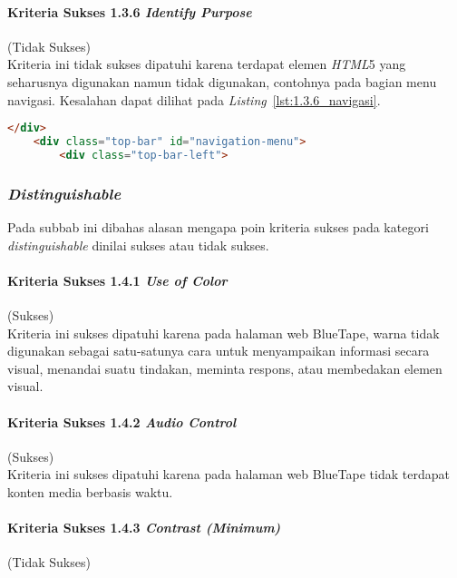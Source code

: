 \paragraph{Kriteria Sukses 1.3.6 \textit{Identify Purpose}}
\label{par:kepatuhan_bluetape_kriteria_sukses_1.3.6}
(Tidak Sukses)\\

Kriteria ini tidak sukses dipatuhi karena terdapat elemen \textit{HTML}5 yang seharusnya digunakan namun tidak digunakan, contohnya pada bagian menu navigasi. Kesalahan dapat dilihat pada \mbox{\textit{Listing} \ref{lst:1.3.6_navigasi}}.

\begin{lstlisting}[frame=single, label={lst:1.3.6_navigasi}, language=HTML, caption=Pelanggaran Kriteria Sukses 1.3.6 pada Menu Navigasi]
    </div>
    <div class="top-bar" id="navigation-menu">
        <div class="top-bar-left">
\end{lstlisting}

\subsubsection{\textit{Distinguishable}}
\label{subsubsec:kepatuhan_bluetape_distinguishable}
Pada subbab ini dibahas alasan mengapa poin kriteria sukses pada kategori \textit{distinguishable} dinilai sukses atau tidak sukses.

\paragraph{Kriteria Sukses 1.4.1 \textit{Use of Color}}
\label{par:kepatuhan_bluetape_kriteria_sukses_1.4.1}
(Sukses)\\

Kriteria ini sukses dipatuhi karena pada halaman web BlueTape, warna tidak digunakan sebagai satu-satunya cara untuk menyampaikan informasi secara visual, menandai suatu tindakan, meminta respons, atau membedakan elemen visual.

\paragraph{Kriteria Sukses 1.4.2 \textit{Audio Control}}
\label{par:kepatuhan_bluetape_kriteria_sukses_1.4.2}
(Sukses)\\

Kriteria ini sukses dipatuhi karena pada halaman web BlueTape tidak terdapat konten media berbasis waktu.

\paragraph{Kriteria Sukses 1.4.3 \textit{Contrast (Minimum)}}
\label{par:kepatuhan_bluetape_kriteria_sukses_1.4.3}
(Tidak Sukses)\\

